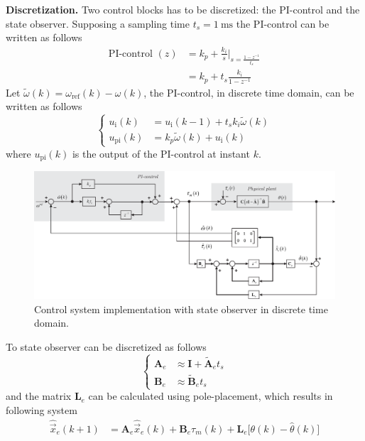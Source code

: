\documentclass[11pt,a4paper,oneside]{book}
\numberwithin{equation}{section}
\theoremstyle{it}
\theoremstyle{definition}
\begin{document}
	\vspace{5mm}
	\textbf{Discretization.}
	Two control blocks has to be discretized: the PI-control and the state observer. Supposing a sampling time $t_s=\SI{1}{\milli\second}$ the PI-control can be written as follows
	\begin{equation} \label{}
		\begin{aligned}
			\text{PI-control }(z)&= k_p+\frac{k_i}{s} \Bigg|_{s=\frac{1-z^{-1}}{t_s}} \\[6pt]
			&= k_p + t_s\frac{k_i}{1-z^{-1}} 
		\end{aligned}
	\end{equation}
	Let $\tilde{\omega}(k)=\omega_\text{ref}(k)-\omega(k)$, the PI-control, in discrete time domain, can be written as follows
	\begin{equation} \label{}
		\left\lbrace \begin{aligned}
			u_\text{i}(k) &= u_\text{i}(k-1) + t_sk_i \tilde{\omega}(k) \\[6pt]
			u_\text{pi}(k) &= k_p\tilde{\omega}(k)+ u_\text{i}(k)
		\end{aligned}\right. 
	\end{equation} 
	where $u_\text{pi}(k)$ is the output of the PI-control at instant $k$.
	\begin{figure}[H]
		\centering
		\includegraphics[width = 500pt, angle=0, 
		keepaspectratio]{figures/dynamical_plant_ctrl_dt.eps}
		\captionsetup{width=0.5\textwidth, font=small}		
		\caption{Control system implementation with state observer in discrete time 
			domain.}
		\label{ctrl_dt}
	\end{figure}
	To state observer can be discretized as follows
	\begin{equation}\label{}
		\left\lbrace \begin{aligned}
			\mathbf{A}_e &\approx \mathbf{I} + {\tilde{\mathbf{A}}_et_s} \\[6pt]
			\mathbf{B}_e &\approx \tilde{\mathbf{B}}_e t_s 
		\end{aligned}\right. 
	\end{equation}
	and the matrix $\mathbf{L}_e$ can be calculated using pole-placement, which results in following system
	\begin{equation} \label{}
		\begin{split}
			{\hat{\vec x}}_e(k+1) & = \mathbf{A}_e\hat{\vec x}_e(k) + \mathbf{B}_e\tau_m(k) + \mathbf{L}_e\Big[\theta(k) - \hat{\theta}(k)\Big]
		\end{split}
	\end{equation}
	
\end{document}
